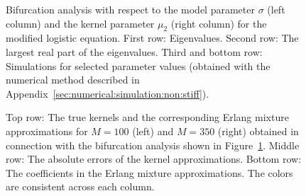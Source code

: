 %
\begin{figure}
	\centering
	\caption{Bifurcation analysis with respect to the model parameter $\sigma$ (left column) and the kernel parameter $\mu_2$ (right column) for the modified logistic equation. First row: Eigenvalues. Second row: The largest real part of the eigenvalues. Third and bottom row: Simulations for selected parameter values (obtained with the numerical method described in Appendix~\ref{sec:numerical:simulation:non:stiff}).}
	\label{fig:logistic:equation:bifurcation:analysis}
\end{figure}
%
\begin{figure}
	\centering
	\caption{Top row: The true kernels and the corresponding Erlang mixture approximations for $M = 100$ (left) and $M = 350$ (right) obtained in connection with the bifurcation analysis shown in Figure~\ref{fig:logistic:equation:bifurcation:analysis}. Middle row: The absolute errors of the kernel approximations. Bottom row: The coefficients in the Erlang mixture approximations. The colors are consistent across each column.}
	\label{fig:logistic:equation:identified:kernels}
\end{figure}

